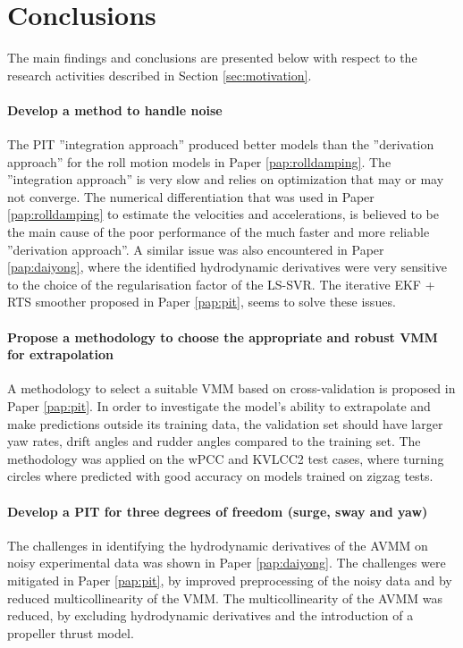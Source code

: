 \chapter{Conclusions\label{ch:conclusions}}
The main findings and conclusions are presented below with respect to the research activities described in Section \ref{sec:motivation}.

\subsubsection*{Develop a method to handle noise}
The PIT ''integration approach'' produced better models than the ''derivation approach'' for the roll motion models in Paper \ref{pap:rolldamping}. The ''integration approach'' is very slow and relies on optimization that may or may not converge.
The numerical differentiation that was used in Paper \ref{pap:rolldamping} to estimate the velocities and accelerations, is believed to be the main cause of the poor performance of the much faster and more reliable ''derivation approach''. A similar issue was also encountered in Paper \ref{pap:daiyong}, where the identified hydrodynamic derivatives were very sensitive to the choice of the regularisation factor of the LS-SVR.
The iterative EKF + RTS smoother proposed in Paper \ref{pap:pit}, seems to solve these issues.

\subsubsection*{Propose a methodology to choose the appropriate and robust VMM for extrapolation}
A methodology to select a suitable VMM based on cross-validation is proposed in Paper \ref{pap:pit}. In order to investigate the model's ability to extrapolate and make predictions outside its training data, the validation set should have larger yaw rates, drift angles and rudder angles compared to the training set. The methodology was applied on the wPCC and KVLCC2 test cases, where turning circles where predicted with good accuracy on models trained on zigzag tests. 

\subsubsection*{Develop a PIT for three degrees of freedom (surge, sway and yaw)}
The challenges in identifying the hydrodynamic derivatives of the AVMM on noisy experimental data was shown in Paper \ref{pap:daiyong}. The challenges were mitigated in Paper \ref{pap:pit}, by improved preprocessing of the noisy data and by reduced multicollinearity of the VMM. The multicollinearity of the AVMM was reduced, by excluding hydrodynamic derivatives and the introduction of a propeller thrust model.

